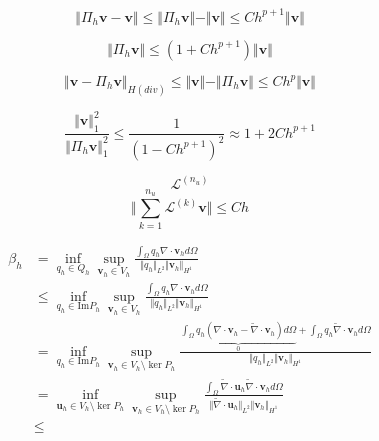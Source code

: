 \begin{equation}
\Vert \Pi_h \boldsymbol v - \boldsymbol v \Vert \le \Vert \Pi_h \boldsymbol v \Vert - \Vert \boldsymbol v \Vert \le Ch^{p+1}\Vert \boldsymbol v \Vert
\end{equation}

\begin{equation}
    \Vert \Pi_h \boldsymbol v \Vert \le (1+Ch^{p+1})\Vert \boldsymbol v \Vert
\end{equation}

\begin{equation}
    \Vert \boldsymbol v - \Pi_h \boldsymbol v \Vert_{H(div)} \le \Vert \boldsymbol v \Vert - \Vert \Pi_h \boldsymbol v \Vert \le Ch^{p}\Vert \boldsymbol v \Vert
\end{equation}

\begin{equation}
\frac{\Vert \boldsymbol v \Vert_1^2}{\Vert \Pi_h \boldsymbol v \Vert_1^2} \le \frac{1}{(1-Ch^{p+1})^2} \approx 1 + 2Ch^{p+1}
\end{equation}

\begin{equation}
    \mathcal L^{(n_u)}
\end{equation}
\begin{equation}
    \Vert \sum_{k=1}^{n_u} \mathcal L^{(k)} \boldsymbol v \Vert \le C h
\end{equation}


\begin{equation}
\begin{split}
\beta_h &= \inf_{q_h \in Q_h} \sup_{\boldsymbol v_h \in V_h} \frac{\int_{\Omega} q_h \nabla \cdot \boldsymbol v_h d\Omega}{\Vert q_h \Vert_{L^2} \Vert \boldsymbol v_h \Vert_{H^1}} \\
    &\le \inf_{q_h \in \textrm{Im} P_h} \sup_{\boldsymbol v_h \in V_h} \frac{\int_{\Omega} q_h \nabla \cdot \boldsymbol v_h d\Omega}{\Vert q_h \Vert_{L^2} \Vert \boldsymbol v_h \Vert_{H^1}} \\
    &= \inf_{q_h \in \textrm{Im} P_h} \sup_{\boldsymbol v_h \in V_h\setminus \ker P_h} \frac{\underbrace{\int_{\Omega} q_h (\nabla \cdot \boldsymbol v_h - \tilde{\nabla} \cdot \boldsymbol v_h) d\Omega}_{0} + \int_\Omega q_h \tilde{\nabla} \cdot \boldsymbol v_h d\Omega}{\Vert q_h \Vert_{L^2} \Vert \boldsymbol v_h \Vert_{H^1}} \\
    &= \inf_{\boldsymbol u_h \in V_h\setminus \ker P_h} \sup_{\boldsymbol v_h \in V_h\setminus \ker P_h} \frac{\int_{\Omega} \tilde \nabla \cdot \boldsymbol u_h \tilde \nabla \cdot \boldsymbol v_h d\Omega}{\Vert \tilde \nabla \cdot \boldsymbol u_h \Vert_{L^2} \Vert \boldsymbol v_h \Vert_{H^1}} \\
    &\le
\end{split}
\end{equation}

